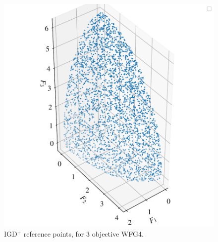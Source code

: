 \documentclass[conference]{IEEEtran}
\newcommand\igd{IGD$^+$\xspace}
\begin{document}
\begin{figure}[t]
\includegraphics[width=\columnwidth]{figures/_IGD_refpoint_example_WFG4.pdf}
\caption{\igd reference points, for 3 objective WFG4.}
\label{fig: refpoints_wfg4}
\end{figure}

\end{document}

